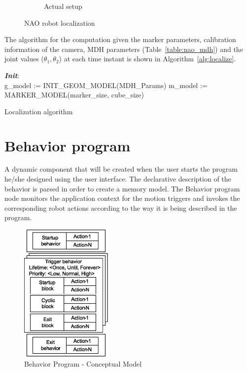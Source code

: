 \begin{figure}[H]
\begin{subfigure}[t]{0.48\textwidth}
\caption[Actual setup]{Actual setup}
\label{fig:localize_setup}
\end{subfigure}
\caption[NAO robot localization]{NAO robot localization}
\label{fig:nao_localization}
\end{figure}

The algorithm for the computation given the marker parameters, calibration information of the camera, MDH parameters (Table~\ref{table:nao_mdh}) and the joint values ($\theta_1,\theta_2$) at each time instant is shown in Algorithm~\ref{alg:localize}.

\begin{algorithm}[H]
 \textbf{\emph{Init}}:\\
 g\_model := INIT\_GEOM\_MODEL(MDH\_Params)\;
 m\_model := MARKER\_MODEL(marker\_size, cube\_size)\;
 \caption{Localization algorithm}
 \label{alg:localize}
\end{algorithm}
\section{Behavior program} 
\label{ssec:behavior_program}
A dynamic component that will be created when the user starts the program he/she designed using the user interface. The declarative description of the behavior is parsed in order to create a memory model. The Behavior program node monitors the application context for the motion triggers and invokes the corresponding robot actions according to the way it is being described in the program.
\begin{figure}
\centering
\includegraphics[width=0.4\textwidth]{../thesis/assets/program_structure.eps}
\caption[Behavior Program - Conceptual Model]{Behavior Program - Conceptual Model}
\label{fig:program_concept}
\end{figure}
